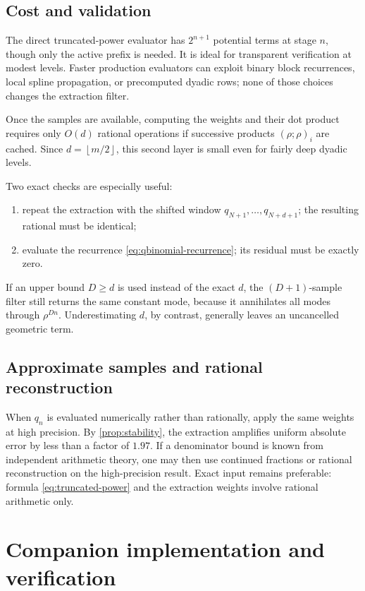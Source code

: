 \documentclass[11pt,oneside]{article}
\theoremstyle{definition}
\theoremstyle{remark}
\newcommand{\floor}[1]{\left\lfloor#1\right\rfloor}
\begin{document}
\subsection{Cost and validation}

The direct truncated-power evaluator has \(2^{n+1}\) potential terms at stage
\(n\), though only the active prefix is needed.  It is ideal for transparent
verification at modest levels.  Faster production evaluators can exploit
binary block recurrences, local spline propagation, or precomputed dyadic
rows; none of those choices changes the extraction filter.

Once the samples are available, computing the weights and their dot product
requires only \(O(d)\) rational operations if successive products
\((\rho;\rho)_i\) are cached.  Since \(d=\floor{m/2}\), this second layer is
small even for fairly deep dyadic levels.

Two exact checks are especially useful:
\begin{enumerate}
 \item repeat the extraction with the shifted window
 \(q_{N+1},\ldots,q_{N+d+1}\); the resulting rational must be identical;
 \item evaluate the recurrence \eqref{eq:qbinomial-recurrence}; its residual
 must be exactly zero.
\end{enumerate}
If an upper bound \(D\ge d\) is used instead of the exact \(d\), the
\((D+1)\)-sample filter still returns the same constant mode, because it
annihilates all modes through \(\rho^{Dn}\).  Underestimating \(d\), by
contrast, generally leaves an uncancelled geometric term.

\subsection{Approximate samples and rational reconstruction}

When \(q_n\) is evaluated numerically rather than rationally, apply the same
weights at high precision.  By \cref{prop:stability}, the extraction amplifies
uniform absolute error by less than a factor of \(1.97\).  If a denominator
bound is known from independent arithmetic theory, one may then use continued
fractions or rational reconstruction on the high-precision result.  Exact
input remains preferable: formula \eqref{eq:truncated-power} and the extraction
weights involve rational arithmetic only.

\section{Companion implementation and verification}
\end{document}
